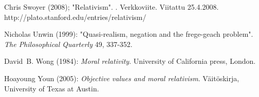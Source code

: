 \documentclass[a4paper,12pt,times,titlepage,finnish]{article}
\begin{document}
\begin{thebibliography}{29}
Chris Swoyer (2008);
\newblock "Relativism".
.
\newblock Verkkoviite. Viitattu 25.4.2008. http://plato.stanford.edu/entries/relativism/

Nicholas Unwin (1999):
\newblock "Quasi-realism, negation and the frege-geach problem".
\newblock \emph{The Philosophical Quarterly} 49, 337-352.

David~B. Wong (1984):
\newblock \emph{Moral relativity}.
\newblock University of {California} press, London.

Hoayoung Youn (2005):
\newblock \emph{Objective values and moral relativism}.
\newblock Väitöskirja, University of Texas at Austin.

\end{thebibliography}
\end{document}

